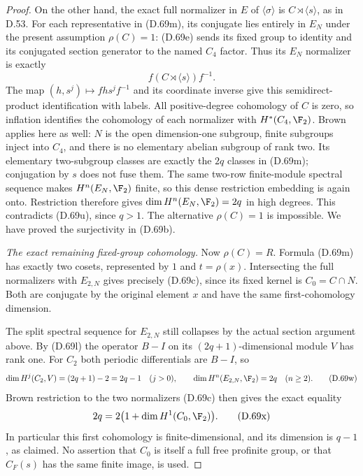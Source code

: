 \begin{proof}
On the other hand, the exact full normalizer in
$E$ of $\langle\sigma\rangle$ is
$C\rtimes\langle s\rangle$, as in D.53.
For each representative in (D.69m), its conjugate
lies entirely in $E_N$ under the present
assumption $\rho(C)=1$: (D.69e) sends its fixed
group to identity and its conjugated section
generator to the named $C_4$ factor.
Thus its $E_N$ normalizer is exactly
\[
                           f(C\rtimes\langle s\rangle)f^{-1}.
                                                               \tag{D.69v}
\]
The map $(h,s^j)\mapsto fhs^jf^{-1}$ and its
coordinate inverse give this semidirect-product
identification with labels.
All positive-degree cohomology of $C$ is zero,
so inflation identifies the cohomology of each
normalizer with $H^*(C_4,\F_2)$.
Brown applies here as well: $N$ is the open
dimension-one subgroup, finite subgroups inject
into $C_4$, and there is no elementary abelian
subgroup of rank two. Its elementary two-subgroup
classes are exactly the $2q$ classes in (D.69m);
conjugation by $s$ does not fuse them.
The same two-row finite-module spectral sequence
makes $H^n(E_N,\F_2)$ finite, so this dense
restriction embedding is again onto.
Restriction therefore gives
$\dim H^n(E_N,\F_2)=2q$ in high degrees.
This contradicts (D.69u), since $q>1$.
The alternative $\rho(C)=1$ is impossible.
We have proved the surjectivity in (D.69b).

\emph{The exact remaining fixed-group cohomology.}
Now $\rho(C)=R$. Formula (D.69m) has exactly two
cosets, represented by $1$ and $t=\rho(x)$.
Intersecting the full normalizers with $E_{2,N}$
gives precisely (D.69c), since its fixed kernel is
$C_0=C\cap N$. Both are conjugate by the original
element $x$ and have the same first-cohomology dimension.

The split spectral sequence for $E_{2,N}$ still
collapses by the actual section argument above.
By (D.69l) the operator $B-I$ on its
$(2q+1)$-dimensional module $V$ has rank one.
For $C_2$ both periodic differentials are $B-I$,
so
\[
 \dim H^j(C_2,V)=(2q+1)-2=2q-1\quad(j>0),\qquad
 \dim H^n(E_{2,N},\F_2)=2q\quad(n\geq2).
                                                               \tag{D.69w}
\]
Brown restriction to the two normalizers (D.69c)
then gives the exact equality
\[
                    2q=2\bigl(1+\dim H^1(C_0,\F_2)\bigr).
                                                               \tag{D.69x}
\]
In particular this first cohomology is finite-dimensional,
and its dimension is $q-1$, as claimed.
No assertion that $C_0$ is itself a full free profinite
group, or that $C_F(s)$ has the same finite image,
is used.


\end{proof}
